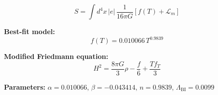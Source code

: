 
\begin{equation}
  S = \int d^4x \, |e| \, \frac{1}{16\pi G} \left[ f(T) + \mathcal{L}_m \right]
\end{equation}

\textbf{Best-fit model:}
\begin{equation}
  f(T) = 0.010066 \, T^{0.9839}
\end{equation}

\textbf{Modified Friedmann equation:}
\begin{equation}
  H^2 = \frac{8\pi G}{3} \rho - \frac{f}{6} + \frac{T f_T}{3}
\end{equation}

\textbf{Parameters:}
$\alpha = 0.010066$, \quad
$\beta = -0.043414$, \quad
$n = 0.9839$, \quad
$\Lambda_{\text{BI}} = 0.0099$